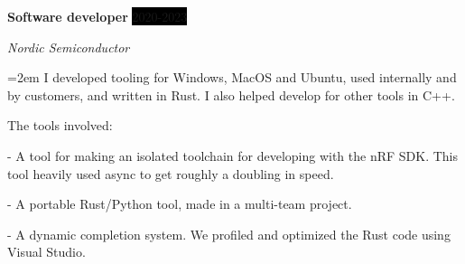 \documentclass[paper=a4,fontsize=11pt,norsk]{scrartcl} %
\newcommand{\EducationEntry}[4]{
		\noindent \textbf{#1} \hfill      %
		\colorbox{Black}{%
			\parbox{6em}{%
			\hfill\color{White}#2}} \par  %
		\noindent \textit{#3} \par        %
		\noindent\hangindent=2em\hangafter=0 \small #4 %
		\normalsize \par}
\newcommand{\WorkEntry}[4]{				  %
		\noindent \textbf{#1} \hfill      %
		\colorbox{Black}{\color{White}#2} \par  %
		\noindent \textit{#3} \par              %
		\noindent\hangindent=2em\hangafter=0 \small #4 %
		\normalsize \par}
\begin{document}







\WorkEntry{Software developer}{2020-2023}{Nordic Semiconductor}
{I developed tooling for Windows, MacOS and Ubuntu, used internally and by customers, and written in Rust. I also helped develop for other tools in C++.

The tools involved:
\par


-  A tool for making an isolated toolchain for developing with the nRF SDK. This tool heavily used async to get roughly a doubling in speed.
\par



- A portable Rust/Python tool, made in a multi-team project.
\par



- A dynamic completion system. We profiled and optimized the Rust code using Visual Studio.
}
\end{document}
